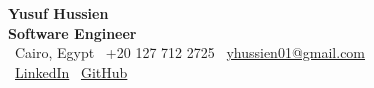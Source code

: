 \begin{center}
    {\Huge \textbf{Yusuf Hussien}} \\[4pt]
    {\large \textbf{Software Engineer}} \\[6pt]

    \faMapMarker\ Cairo, Egypt \quad
    \faPhone\ +20 127 712 2725 \quad
    \faEnvelope\ \href{mailto:yhussien01@gmail.com}{yhussien01@gmail.com} \\[4pt]

  \faLinkedin\ \href{https://linkedin.com/in/yusuf-7ussien}{LinkedIn} \quad
    \faGithub\ \href{https://github.com/Yusuf-Hussien}{GitHub}
\end{center}
